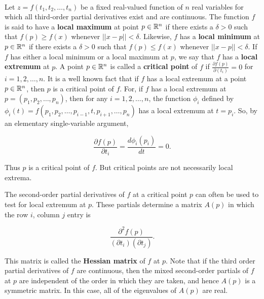 \begin{definition}
	\hfill\\
	Let $z=f(t_1, t_2, \dots, t_n)$ be a fixed real-valued function of $n$ real variables for which all third-order partial derivatives exist and are continuous. The function $f$ is said to have a \textbf{local maximum} at point $p \in \mathbb{R}^n$ if there exists a $\delta > 0$ such that $f(p) \geq f(x)$ whenever $||x - p|| < \delta$. Likewise, $f$ has a \textbf{local minimum} at $p \in \mathbb{R}^n$ if there exists a $\delta > 0$ such that $f(p) \leq f(x)$ whenever $||x - p|| < \delta$. If $f$ has either a local minimum or a local maximum at $p$, we say that $f$ has a \textbf{local extremum} at $p$. A point $p \in \mathbb{R}^n$ is called a \textbf{critical point} of $f$ if $\displaystyle\frac{\partial f(p)}{\partial(t_i)} = 0$ for $i = 1, 2, \dots, n$. It is a well known fact that if $f$ has a local extremum at a point $p \in \mathbb{R}^n$, then $p$ is a critical point of $f$. For, if $f$ has a local extremum at $p=(p_1, p_2, \dots, p_n)$, then for any $i = 1, 2, \dots, n$, the function $\phi_i$ defined by $\phi_i(t) = f(p_1, p_2, \dots, p_{i-1}, t, p_{i+1}, \dots, p_n)$ has a local extremum at $t = p_i$. So, by an elementary single-variable argument,

	\[\frac{\partial f(p)}{\partial t_i} = \frac{d\phi_i(p_i)}{dt} = 0.\]

	Thus $p$ is a critical point of $f$. But critical points are not necessarily local extrema.

	The second-order partial derivatives of $f$ at a critical point $p$ can often be used to test for local extremum at $p$. These partials determine a matrix $A(p)$ in which the row $i$, column $j$ entry is

	\[\frac{\partial^2f(p)}{(\partial t_i)(\partial t_j)}.\]

	This matrix is called the \textbf{Hessian matrix} of $f$ at $p$. Note that if the third order partial derivatives of $f$ are continuous, then the mixed second-order partials of $f$ at $p$ are independent of the order in which they are taken, and hence $A(p)$ is a symmetric matrix. In this case, all of the eigenvalues of $A(p)$ are real.
\end{definition}

